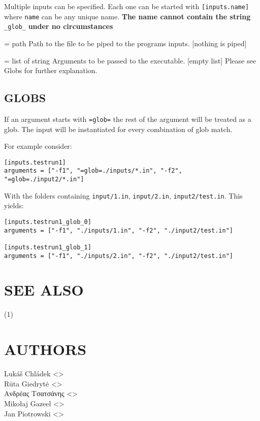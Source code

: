 \documentclass[a4paper,english]{article}
\begin{document}
\begin{adjustwidth}{18pt}{0pt}
      Multiple inputs can be specified. Each one can be started with \texttt{[inputs.name]} where \texttt{name} can be any unique name.
      \textbf{The name cannot contain the string} \texttt{\_glob\_} \textbf{under no circumstances}

      \begin{Description}[Options]\setlength{\itemsep}{0cm}
          \item[\oOpt{input} = path] Path to the file to be piped to the programs inputs. [nothing is piped]
          \item[\oOpt{arguments} = list of string] Arguments to be passed to the executable. [empty list]
            Please see Globs for further explanation.
      \end{Description}


      \subsection{GLOBS}

      If an argument starts with \texttt{=glob=} the rest of the argument will be treated as a glob.
      The input will be instantiated for every combination of glob match.

      \noindent For example consider:

      \begin{verbatim}
[inputs.testrun1]
arguments = ["-f1", "=glob=./inputs/*.in", "-f2", "=glob=./input2/*.in"]
      \end{verbatim}

      \noindent With the folders containing \texttt{input/1.in}, \texttt{input/2.in}, \texttt{input2/test.in}. This yields:

      \begin{verbatim}
[inputs.testrun1_glob_0]
arguments = ["-f1", "./inputs/1.in", "-f2", "./input2/test.in"]

[inputs.testrun1_glob_1]
arguments = ["-f1", "./inputs/2.in", "-f2", "./input2/test.in"]
      \end{verbatim}


  \section{SEE ALSO}
      (1)

  \section{AUTHORS}
    Lukáš Chládek <>\\[0.1cm]\MANbr
    Rūta Giedrytė <>\\[0.1cm]\MANbr
    Ανδρέας Τσατσάνης <>\\[0.1cm]\MANbr
    Mikołaj Gazeel <>\\[0.1cm]\MANbr
    Jan Piotrowski <>
\end{adjustwidth}
\end{document}
